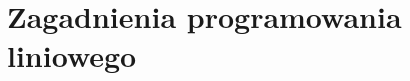 \documentclass[•]{article}
\begin{document}
\section{Zagadnienia programowania liniowego}
\end{document}
